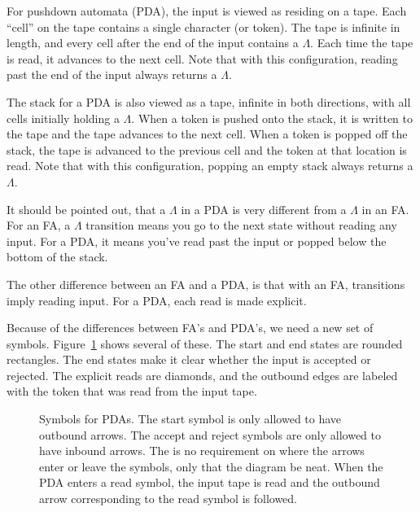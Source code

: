 \documentclass[letterpaper,12pt,openany,reqno]{book}%
\newcommand{\pdaterminal}[3] {\node at (#1) (#2) [rectangle, draw, rounded corners] {#3};}
\newcommand{\pdaread}[3] {\node at (#1) (#2) [diamond, draw] {#3}; }
\newcommand{\pdatransition}[3] {\draw [->] (#1) -- (#2) node [midway, above] {#3};}
\newcommand{\pdarighttransition}[3] {\draw [->] (#1) -- (#2) node [midway, right] {#3};}
\begin{document}
For pushdown automata (PDA), the input is viewed as residing on a tape. Each ``cell'' on the tape contains a single character (or token). The tape is infinite in length, and every cell after the end of the input contains a $\Lambda$. Each time the tape is read, it advances to the next cell. Note that with this configuration, reading past the end of the input always returns a $\Lambda$.

The stack for a PDA is also viewed as a tape, infinite in both directions, with all cells initially holding a $\Lambda$. When a token is pushed onto the stack, it is written to the tape and the tape advances to the next cell. When a token is popped off the stack, the tape is advanced to the previous cell and the token at that location is read. Note that with this configuration, popping an empty stack always returns a $\Lambda$.

It should be pointed out, that a $\Lambda$ in a PDA is very different from a $\Lambda$ in an FA. For an FA, a $\Lambda$ transition means you go to the next state without reading any input. For a PDA, it means you've read past the input or popped below the bottom of the stack.

The other difference between an FA and a PDA, is that with an FA, transitions imply reading input. For a PDA, each read is made explicit.

Because of the differences between FA's and PDA's, we need a new set of symbols. Figure~\ref{F.pda.symbols} shows several of these. The start and end states are rounded rectangles. The end states make it clear whether the input is accepted or rejected. The explicit reads are diamonds, and the outbound edges are labeled with the token that was read from the input tape.

\begin{figure}[htbp]
\centering
{}

\caption[Symbols for PDAs]{Symbols for PDAs. The start symbol is only allowed to have outbound arrows. The accept and reject symbols are only allowed to have inbound arrows. The is no requirement on where the arrows enter or leave the symbols, only that the diagram be neat. When the PDA enters a read symbol, the input tape is read and the outbound arrow corresponding to the read symbol is followed.}
\label{F.pda.symbols}
\end{figure}
\end{document}
